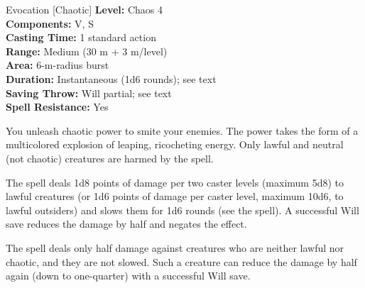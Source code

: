 {Evocation [Chaotic]}
{
	\textbf{Level:}
	Chaos 4\\
	\textbf{Components:}
	V, S\\
	\textbf{Casting Time:}
	1 standard action\\
	\textbf{Range:}
	Medium (30 m + 3 m/level)\\
	\textbf{Area:}
	6-m-radius burst\\
	\textbf{Duration:}
	Instantaneous (1d6 rounds); see text\\
	\textbf{Saving Throw:}
	Will partial; see text\\
	\textbf{Spell Resistance:}
	Yes\\
}
{
	You unleash chaotic power to smite your enemies. The power takes the form of a multicolored explosion of leaping, ricocheting energy. Only lawful and neutral (not chaotic) creatures are harmed by the spell.

	The spell deals 1d8 points of damage per two caster levels (maximum 5d8) to lawful creatures (or 1d6 points of damage per caster level, maximum 10d6, to lawful outsiders) and slows them for 1d6 rounds (see the  spell). A successful Will save reduces the damage by half and negates the  effect.

	The spell deals only half damage against creatures who are neither lawful nor chaotic, and they are not slowed. Such a creature can reduce the damage by half again (down to one-quarter) with a successful Will save.

}
